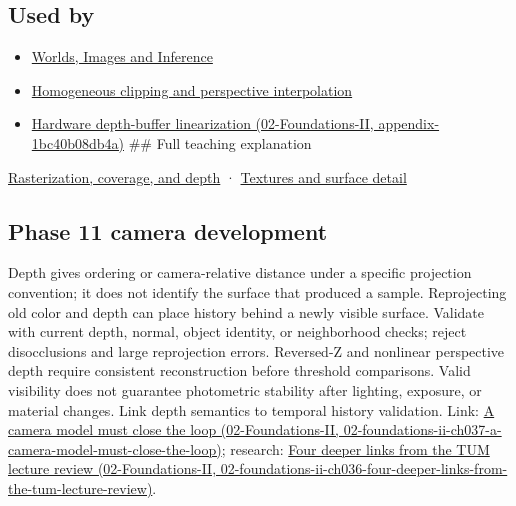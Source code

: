\subsection{Used by}\label{appendix-97578ed97952-used-by}

\begin{itemize}
\item
  \href{Continuous\%20Notes/University\%20-\%20Worlds,\%20Images\%20and\%20Inference\%20-\%20Graphics,\%20Vision\%20and\%20Photography}{Worlds, Images and Inference}
\item
  \hyperref[appendix-40426e4b2103]{Homogeneous clipping and perspective interpolation}
\item
  \href{../02-Foundations-II/main.pdf\#nameddest=appendix-1bc40b08db4a}{Hardware depth-buffer linearization (02-Foundations-II, appendix-1bc40b08db4a)} \#\# Full teaching explanation
\end{itemize}

\hyperref[03-visual-computing-i-ch012-rasterization-coverage-and-depth]{Rasterization, coverage, and depth} · \hyperref[03-visual-computing-i-ch019-textures-and-surface-detail]{Textures and surface detail}

\subsection{Phase 11 camera development}\label{appendix-97578ed97952-phase-11-camera-development}

Depth gives ordering or camera-relative distance under a specific projection convention; it does not identify the surface that produced a sample. Reprojecting old color and depth can place history behind a newly visible surface. Validate with current depth, normal, object identity, or neighborhood checks; reject disocclusions and large reprojection errors. Reversed-Z and nonlinear perspective depth require consistent reconstruction before threshold comparisons. Valid visibility does not guarantee photometric stability after lighting, exposure, or material changes. Link depth semantics to temporal history validation. Link: \href{../02-Foundations-II/main.pdf\#nameddest=02-foundations-ii-ch037-a-camera-model-must-close-the-loop}{A camera model must close the loop (02-Foundations-II, 02-foundations-ii-ch037-a-camera-model-must-close-the-loop)}; research: \href{../02-Foundations-II/main.pdf\#nameddest=02-foundations-ii-ch036-four-deeper-links-from-the-tum-lecture-review}{Four deeper links from the TUM lecture review (02-Foundations-II, 02-foundations-ii-ch036-four-deeper-links-from-the-tum-lecture-review)}.
